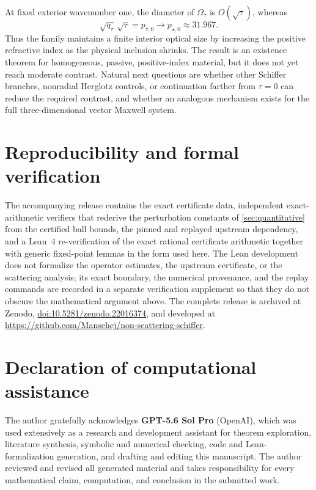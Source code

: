 \documentclass[11pt]{amsart}
\begin{document}
At fixed exterior wavenumber one, the diameter of $\Omega_\tau$ is
$O(\sqrt\tau)$, whereas
\begin{equation}\label{eq:opticalsize}
  \sqrt{q_\tau}\,\sqrt\tau=p_{\tau,0}
  \longrightarrow p_{\star,0}\approx31.967.
\end{equation}
Thus the family maintains a finite interior optical size by increasing the
positive refractive index as the physical inclusion shrinks.  The result is
an existence theorem for homogeneous, passive, positive-index material, but
it does not yet reach moderate contrast.  Natural next questions are whether
other Schiffer branches, nonradial Herglotz controls, or continuation farther
from $\tau=0$ can reduce the required contrast, and whether an analogous
mechanism exists for the full three-dimensional vector Maxwell system.

\section*{Reproducibility and formal verification}

The accompanying release contains the exact certificate data, independent
exact-arithmetic verifiers that rederive the perturbation constants of
\cref{sec:quantitative} from the certified ball bounds, the pinned and
replayed upstream dependency, and a Lean~4 re-verification of the exact
rational certificate arithmetic together with generic fixed-point lemmas in
the form used here.  The Lean development does not formalize the operator
estimates, the upstream certificate, or the scattering analysis; its exact
boundary, the numerical provenance, and the replay commands are recorded in
a separate verification supplement so that they do not obscure the
mathematical argument above.  The complete release is archived at
Zenodo, \href{https://doi.org/10.5281/zenodo.22016374}%
{doi:10.5281/zenodo.22016374}, and developed at
\url{https://github.com/Mansehej/non-scattering-schiffer}.

\section*{Declaration of computational assistance}

The author gratefully acknowledges \textbf{GPT-5.6 Sol Pro} (OpenAI), which
was used extensively as a research and development assistant for theorem
exploration, literature synthesis, symbolic and numerical checking, code and
Lean-formalization generation, and drafting and editing this manuscript.  The
author reviewed and revised all generated material and takes responsibility
for every mathematical claim, computation, and conclusion in the submitted
work.


\end{document}
